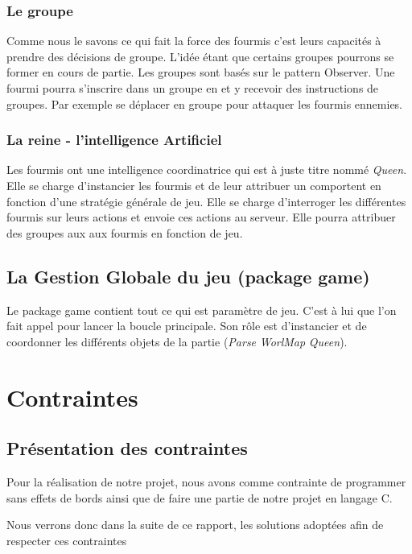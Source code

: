 \documentclass[11pt,a4paper]{article}
\begin{document}
\subsubsection{Le groupe}
Comme nous le savons ce qui fait la force des fourmis c'est leurs capacités à prendre des décisions de groupe. L'idée étant que certains groupes pourrons se former en cours de partie. Les groupes sont basés sur le pattern Observer. Une fourmi pourra s'inscrire dans un groupe en et y recevoir des instructions de groupes. Par exemple se déplacer en groupe pour attaquer les fourmis ennemies.

\subsubsection{La reine - l'intelligence Artificiel}
Les fourmis ont une intelligence coordinatrice qui est à juste titre nommé \emph{Queen}. Elle se charge d’instancier les fourmis et de leur attribuer un comportent en fonction d'une stratégie générale de jeu. Elle se charge d’interroger les différentes fourmis sur leurs actions et envoie ces actions au serveur. Elle pourra attribuer des groupes aux aux fourmis en fonction de jeu.


\subsection{La Gestion Globale du jeu (package game)}
Le package game contient tout ce qui est paramètre de jeu. C'est à lui que l'on fait appel pour lancer la boucle principale. Son rôle est d'instancier et de coordonner les différents objets de la partie (\emph{Parse} \emph{WorlMap} \emph{Queen}).

\section{Contraintes}

\subsection{Présentation des contraintes}

Pour la réalisation de notre projet, nous avons comme contrainte de programmer sans effets de bords ainsi que de faire une partie de notre projet en langage C.\newline

Nous verrons donc dans la suite de ce rapport, les solutions adoptées afin de respecter ces contraintes
\end{document}
